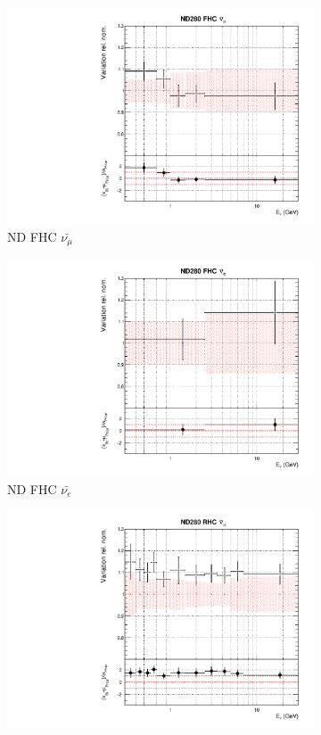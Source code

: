 \begin{figure}
\begin{subfigure}{0.24\textwidth}
\end{subfigure}
\begin{subfigure}{0.24\textwidth}
  \centering
  \includegraphics[width=0.95\linewidth]{figs/datflux2}
  \caption{ND FHC $\bar{\nu_{\mu}}$}
\end{subfigure}
\begin{subfigure}{0.24\textwidth}
  \centering
  \includegraphics[width=0.95\linewidth]{figs/datflux3}
  \caption{ND FHC $\bar{\nu_{e}}$}
\end{subfigure}
\begin{subfigure}{0.24\textwidth}
  \centering
  \includegraphics[width=0.95\linewidth]{figs/datflux4}

\end{subfigure}
\end{figure}

